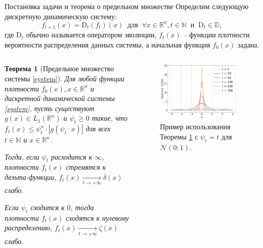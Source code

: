 \documentclass[aspectratio=169]{beamer}
\newtheorem{theorem_rus}{Теорема}
\begin{document}
\begin{frame}{Постановка задачи и теорема о предельном множестве}
Определим следующую дискретную динамическую систему:
    \begin{equation}
        \label{system}
        f_{t+1}(x) = \text{D}_t(f_t)(x) ~ \text{ для } ~ \forall x \in \mathbb{R}^n, t \in \mathbb{N} ~\text{ и } ~ \text{D}_t \in \mathbb{D},
    \end{equation}
    где $\text{D}_t$ обычно называется оператором эволюции, $f_t(x)$ -- функции плотности вероятности распределения данных системы, а начальная функция $f_0(x)$ задана. 
    \vspace{-2mm}
    \begin{columns}[c]
    \begin{theorem_rus}[Предельное множество системы \eqref{system}] \label{delta}
        Для любой функции плотности $f_0(x), x \in \mathbb{R}^n$ и дискретной динамической системы \eqref{system}, пусть существуют $ g(x) \in L_1\left(\mathbb{R}^n\right)$ и $\psi_t \geq 0$ такие, что $f_t\left(x\right) \leq \psi_t^n \cdot |g(\psi_t \cdot x)|$ для всех $t \in \mathbb{N}$ и $x \in \mathbb{R}^n$.
    
        Тогда, если $\psi_t$ расходится к $\infty$, плотности $f_t(x)$ стремятся к дельта-функции, $f_t(x) \underset{t \to +\infty}{\longrightarrow} \delta(x)$ слабо.  
    
        Если $\psi_t$ сходится к $0$, тогда плотности $f_t(x)$ сходятся к нулевому распределению, $f_t(x) \underset{t \to +\infty}{\longrightarrow} \zeta(x)$ слабо.
    \end{theorem_rus}
    \begin{figure}
        \centering
        \includegraphics[width=0.97\textwidth]{fig/fig1_Normal.png}
        \vspace{-2mm}
        \caption{\footnotesize{Пример использования Теоремы \ref{delta} с $\psi_t = t$ для $\mathcal{N}(0; 1)$.}}
    \end{figure}
    \end{columns}
\end{frame}
\end{document}

